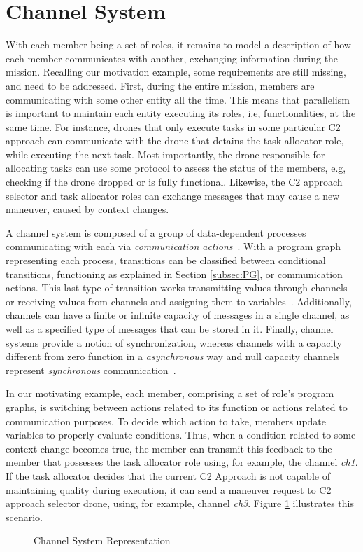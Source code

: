 \section{Channel System}
\label{sec:channelSystem}

With each member being a set of roles, it remains to model a description of how each member communicates with another, exchanging information during the mission. Recalling our motivation example, some requirements are still missing, and need to be addressed. First, during the entire mission, members are communicating with some other entity all the time. This means that parallelism is important to maintain each entity executing its roles, i.e, functionalities, at the same time. For instance, drones that only execute tasks in some particular C2 approach can communicate with the drone that detains the task allocator role, while executing the next task. Most importantly, the drone responsible for allocating tasks can use some protocol to assess the status of the members, e.g, checking if the drone dropped or is fully functional. Likewise, the C2 approach selector and task allocator roles can exchange messages that may cause a new maneuver, caused by context changes.

A channel system is composed of a group of data-dependent processes communicating with each via \textit{communication actions}~\cite{modelcheckingBaier}. With a program graph representing each process, transitions can be classified between conditional transitions, functioning as explained in Section \ref{subsec:PG}, or communication actions. This last type of transition works transmitting values through channels or receiving values from channels and assigning them to variables~\cite{modelcheckingBaier}. Additionally, channels can have a finite or infinite capacity of messages in a single channel, as well as a specified type of messages that can be stored in it. Finally, channel systems provide a notion of synchronization, whereas channels with a capacity different from zero function in a \textit{asynchronous} way and null capacity channels represent \textit{synchronous} communication~\cite{modelcheckingBaier}.

In our motivating example, each member, comprising a set of role's program graphs, is switching between actions related to its function or actions related to communication purposes. To decide which action to take, members update variables to properly evaluate conditions. Thus, when a condition related to some context change becomes true, the member can transmit this feedback to the member that possesses the task allocator role using, for example, the channel \textit{ch1}. If the task allocator decides that the current C2 Approach is not capable of maintaining quality during execution, it can send a maneuver request to C2 approach selector drone, using, for example, channel \textit{ch3}. Figure \ref{fig:CS} illustrates this scenario.

\begin{figure}[!ht]
    \centering
    \scalebox{.75}{}
    \caption{Channel System Representation}
    \label{fig:CS}
\end{figure}